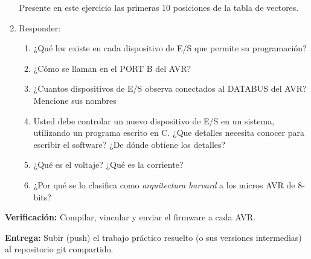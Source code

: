 \begin{enumerate}
            \vspace{0.3cm}

            Presente en este ejercicio las primeras 10 posiciones de la tabla de vectores.

      \item
            Responder:
            \begin{enumerate}
                  \item ¿Qué hw existe en cada dispositivo de E/S que permite su programación?
                  \item ¿Cómo se llaman en el PORT B del AVR?
                  \item ¿Cuantos dispositivos de E/S observa conectados al DATABUS del AVR? Mencione sus nombres
                  \item Usted debe controlar un nuevo dispositivo de E/S en un sistema, utilizando un programa escrito en C. ¿Que detalles necesita conocer para escribir el software? ¿De dónde obtiene los detalles?
                  \item ¿Qué es el voltaje? ¿Qué es la corriente?
                  \item ¿Por qué se lo clasifica como \textit{arquitectura harvard} a los micros AVR de 8-bits?
            \end{enumerate}
\end{enumerate}

\textbf{Verificación: } Compilar, vincular y enviar el firmware a cada AVR.

\vspace{0.3cm}

\textbf{Entrega: } Subir (push) el trabajo práctico resuelto (o sus versiones intermedias) al repositorio git compartido.